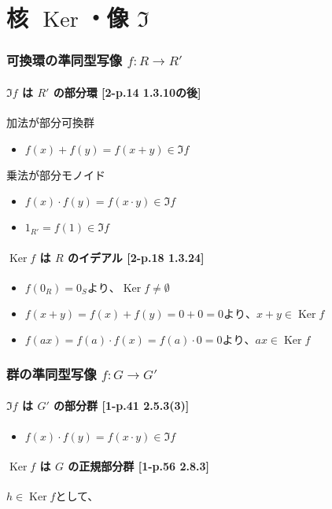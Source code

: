 \documentclass[twocolumn]{jsarticle}
\DeclareMathOperator{\Ker}{Ker}
\begin{document}
\newpage

\part*{核 \(\Ker\)・像 \(\Im\)}
\setcounter{section}{0}
\section{可換環の準同型写像 \(f\colon R \to R'\)}
\subsection{\(\Im f\) は \(R'\) の部分環 [2-p.14 1.3.10の後]}
加法が部分可換群
\begin{itemize}
    \item \(f(x)+f(y)=f(x+y) \in \Im f\)
\end{itemize}

乗法が部分モノイド
\begin{itemize}
    \item \(f(x)\cdot f(y)= f(x\cdot y) \in \Im f\) 
    \item \(1_{R'} = f(1) \in \Im f\)
\end{itemize}
\subsection{\(\Ker f\) は \(R\) のイデアル [2-p.18 1.3.24]}
\begin{itemize}
    \item \(f(0_R)=0_S より、\Ker f \neq \emptyset\)
    \item \(f(x+y)= f(x)+f(y) = 0+0=0 より、x+y \in \Ker f\)
    \item \(f(ax)=f(a)\cdot f(x)=f(a)\cdot 0 = 0 より、ax \in \Ker f\)
\end{itemize}
\section{群の準同型写像 \(f\colon G \to G'\)}
\subsection{\(\Im f\) は \(G'\) の部分群 [1-p.41 2.5.3(3)]}
\begin{itemize}
    \item \(f(x)\cdot f(y)= f(x\cdot y) \in \Im f\) 
\end{itemize}
\subsection{\(\Ker f\) は \(G\) の正規部分群 [1-p.56 2.8.3]}
\(h\in \Ker f\)として、
\end{document}
